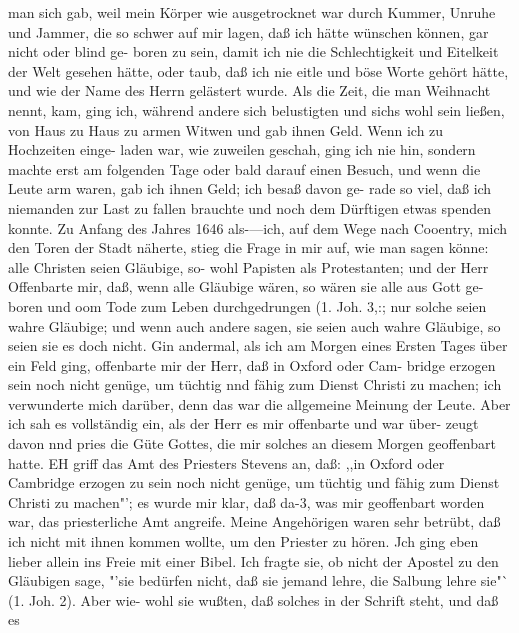 man sich gab, weil mein Körper wie ausgetrocknet war
durch Kummer, Unruhe und Jammer, die so schwer auf mir
lagen, daß ich hätte wünschen können, gar nicht oder blind ge-
boren zu sein, damit ich nie die Schlechtigkeit und Eitelkeit der
Welt gesehen hätte, oder taub, daß ich nie eitle und böse Worte
gehört hätte, und wie der Name des Herrn gelästert wurde. Als
die Zeit, die man Weihnacht nennt, kam, ging ich, während andere
sich belustigten und sichs wohl sein ließen, von Haus zu Haus zu
armen Witwen und gab ihnen Geld. Wenn ich zu Hochzeiten einge-
laden war, wie zuweilen geschah, ging ich nie hin, sondern machte
erst am folgenden Tage oder bald darauf einen Besuch, und wenn
die Leute arm waren, gab ich ihnen Geld; ich besaß davon ge-
rade so viel, daß ich niemanden zur Last zu fallen brauchte und
noch dem Dürftigen etwas spenden konnte.
Zu Anfang des Jahres 1646 als-—ich, auf dem Wege nach
Cooentry, mich den Toren der Stadt näherte, stieg die Frage in
mir auf, wie man sagen könne: alle Christen seien Gläubige, so-
wohl Papisten als Protestanten; und der Herr Offenbarte mir,
daß, wenn alle Gläubige wären, so wären sie alle aus Gott ge-
boren und oom Tode zum Leben durchgedrungen (1. Joh. 3,:;
nur solche seien wahre Gläubige; und wenn auch andere sagen,
sie seien auch wahre Gläubige, so seien sie es doch nicht.
Gin andermal, als ich am Morgen eines Ersten Tages über
ein Feld ging, offenbarte mir der Herr, daß in Oxford oder Cam-
bridge erzogen sein noch nicht genüge, um tüchtig nnd fähig zum
Dienst Christi zu machen; ich verwunderte mich darüber, denn
das war die allgemeine Meinung der Leute. Aber ich sah es
vollständig ein, als der Herr es mir offenbarte und war über-
zeugt davon nnd pries die Güte Gottes, die mir solches an diesem
Morgen geoffenbart hatte. EH griff das Amt des Priesters Stevens
an, daß: ,,in Oxford oder Cambridge erzogen zu sein noch nicht
genüge, um tüchtig und fähig zum Dienst Christi zu machen"'; es
wurde mir klar, daß da-3, was mir geoffenbart worden war, das
priesterliche Amt angreife. Meine Angehörigen waren sehr betrübt,
daß ich nicht mit ihnen kommen wollte, um den Priester zu hören.
Jch ging eben lieber allein ins Freie mit einer Bibel. Ich fragte sie,
ob nicht der Apostel zu den Gläubigen sage, "'sie bedürfen nicht, daß
sie jemand lehre, die Salbung lehre sie"` (1. Joh. 2). Aber wie-
wohl sie wußten, daß solches in der Schrift steht, und daß es



